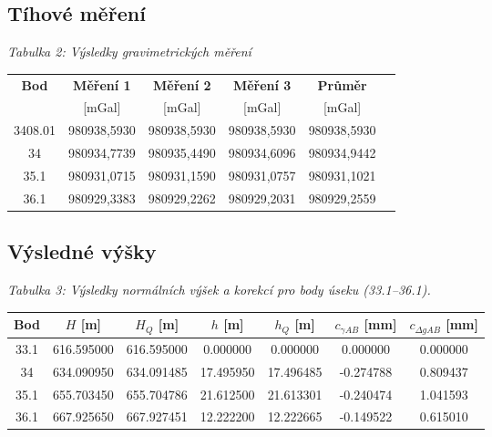 \subsection{Tíhové měření}

\begin{table}[H]
  \centering
  \textit{Tabulka 2: Výsledky gravimetrických měření}
  \begin{tabular}{|c|c|c|c|c|c|}
    \hline
    \textbf{Bod} & \textbf{Měření 1} & \textbf{Měření 2} & \textbf{Měření 3} & \textbf{Průměr} \\
    & {[mGal]} & {[mGal]} & {[mGal]} & {[mGal]} \\ 
    \hline\hline
    3408.01 & 980938,5930 & 980938,5930 & 980938,5930 & 980938,5930 \\ \hline
    34   & 980934,7739 & 980935,4490 & 980934,6096 & 980934,9442 \\ \hline
    35.1 & 980931,0715 & 980931,1590 & 980931,0757 & 980931,1021\\ \hline
    36.1 & 980929,3383 & 980929,2262 & 980929,2031 & 980929,2559\\ \hline
  \end{tabular}
\end{table}

\hspace{1 cm}

\subsection{Výsledné výšky}

\begin{table}[H]
  \centering
  \textit{Tabulka 3: Výsledky normálních výšek a korekcí pro body úseku (33.1–36.1).}
  \begin{tabular}{|c|c|c|c|c|c|c|}
    \hline
    \textbf{Bod} & \textbf{\(H\) [m]} & \textbf{\(H_Q\) [m]} & \textbf{\(h\) [m]} & \textbf{\(h_Q\) [m]} & \textbf{\(c_{\gamma AB}\) [mm]} & \textbf{\(c_{\Delta g AB}\) [mm]} \\
    \hline\hline
    33.1 & 616.595000 & 616.595000 & 0.000000 & 0.000000 &  0.000000 & 0.000000 \\
    34 & 634.090950 & 634.091485 & 17.495950 & 17.496485 & -0.274788 & 0.809437 \\
    35.1 & 655.703450 & 655.704786 & 21.612500 & 21.613301 & -0.240474 & 1.041593 \\
    36.1 & 667.925650 & 667.927451 & 12.222200 & 12.222665 & -0.149522 & 0.615010 \\
    \hline
  \end{tabular}
  \label{tab:norm_vysky_33_36}
\end{table}

